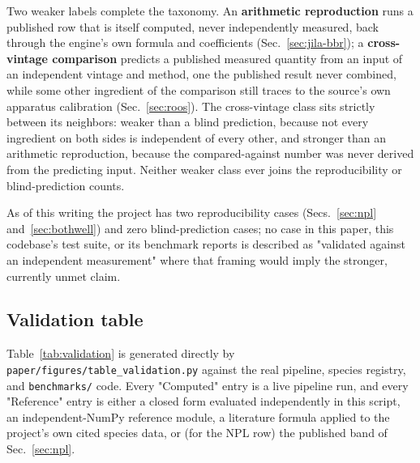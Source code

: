 \documentclass[aps,pra,superscriptaddress,groupedaddress,nofootinbib]{revtex4-2}
\begin{document}
Two weaker labels complete the taxonomy. An \textbf{arithmetic
reproduction} runs a published row that is itself computed, never
independently measured, back through the engine's own formula and
coefficients (Sec.~\ref{sec:jila-bbr}); a \textbf{cross-vintage
comparison} predicts a published measured quantity from an input of an
independent vintage and method, one the published result never
combined, while some other ingredient of the comparison still traces to
the source's own apparatus calibration (Sec.~\ref{sec:roos}). The
cross-vintage class sits strictly between its neighbors: weaker than a
blind prediction, because not every ingredient on both sides is
independent of every other, and stronger than an arithmetic
reproduction, because the compared-against number was never derived
from the predicting input. Neither weaker class ever joins the
reproducibility or blind-prediction counts.

As of this writing the project has two reproducibility cases
(Secs.~\ref{sec:npl} and~\ref{sec:bothwell}) and zero blind-prediction
cases; no case in this paper, this codebase's test suite, or its
benchmark reports is described as "validated against an independent
measurement" where that framing would imply the stronger, currently
unmet claim.

\subsection{Validation table}

Table~\ref{tab:validation} is generated directly by
\texttt{paper/figures/table\_validation.py} against the real pipeline,
species registry, and \texttt{benchmarks/} code. Every "Computed"
entry is a live pipeline run, and every "Reference" entry is either a
closed form evaluated independently in this script, an
independent-NumPy reference module, a literature formula applied to the
project's own cited species data, or (for the NPL row) the published
band of Sec.~\ref{sec:npl}.

\begin{table}[htbp]
\centering
\caption{Validation summary: case, reference value/method, this
pipeline's computed value, and measured agreement. V1--V4 are
closed-form self-consistency cases (this engine against its own
analytically solvable configurations and, for V3, an independent
plain-NumPy re-implementation); KA1--KA4 are literature known-answer
cases (textbook DC-Stark and second-order-Doppler formulas, using this
project's cited $\Delta\alpha$ values); E24 is the rotor/scalar
cross-check of Sec.~\ref{sec:rotor-verification}; NPL and Bothwell are
the two experimental reproducibility cases (Secs.~\ref{sec:npl}
and~\ref{sec:bothwell}); Roos is the cross-vintage quadrupole-slope
comparison of Sec.~\ref{sec:roos}, whose \textit{NOT MET} verdict is the
expected outcome (it recovers the literature's own $\Theta$
theory-versus-measurement tension) and which joins neither headline
count. Generated by
\texttt{paper/figures/table\_validation.py}; see that script and
\texttt{tests/test\_e2e.py} / \texttt{tests/test\_known\_answers.py}
for the exact configurations reproduced.}
\label{tab:validation}

\end{table}
\end{document}
